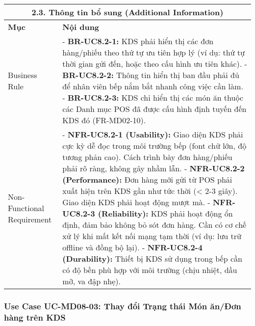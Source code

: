 \begin{longtable}{|m{4cm}|p{11cm}|}
\hline
\multicolumn{2}{|c|}{\textbf{2.3. Thông tin bổ sung (Additional Information)}} \\
\hline
\textbf{Mục} & \textbf{Nội dung} \\
\hline
Business Rule & - \textbf{BR-UC8.2-1:} KDS phải hiển thị các đơn hàng/phiếu theo thứ tự ưu tiên hợp lý (ví dụ: thứ tự thời gian gửi đến, hoặc theo cấu hình ưu tiên khác). \newline - \textbf{BR-UC8.2-2:} Thông tin hiển thị ban đầu phải đủ để nhân viên bếp nắm bắt nhanh công việc cần làm. \newline - \textbf{BR-UC8.2-3:} KDS chỉ hiển thị các món ăn thuộc các Danh mục POS đã được cấu hình định tuyến đến KDS đó (FR-MD02-10). \\
\hline
Non-Functional Requirement & - \textbf{NFR-UC8.2-1 (Usability):} Giao diện KDS phải cực kỳ dễ đọc trong môi trường bếp (font chữ lớn, độ tương phản cao). Cách trình bày đơn hàng/phiếu phải rõ ràng, không gây nhầm lẫn. \newline - \textbf{NFR-UC8.2-2 (Performance):} Đơn hàng mới gửi từ POS phải xuất hiện trên KDS gần như tức thời (< 2-3 giây). Giao diện KDS phải hoạt động mượt mà. \newline - \textbf{NFR-UC8.2-3 (Reliability):} KDS phải hoạt động ổn định, đảm bảo không bỏ sót đơn hàng. Cần có cơ chế xử lý khi mất kết nối mạng tạm thời (ví dụ: lưu trữ offline và đồng bộ lại). \newline - \textbf{NFR-UC8.2-4 (Durability):} Thiết bị KDS sử dụng trong bếp cần có độ bền phù hợp với môi trường (chịu nhiệt, dầu mỡ, va đập nhẹ). \\
\hline
\end{longtable}

\subsubsection{Use Case UC-MD08-03: Thay đổi Trạng thái Món ăn/Đơn hàng trên KDS}

